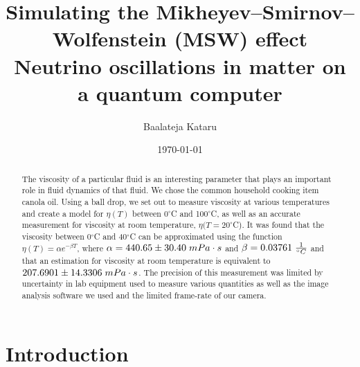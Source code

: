 \documentclass[aps,twocolumn,showpacs,preprintnumbers]{revtex4}
\begin{document}
\title{Simulating the Mikheyev–Smirnov–Wolfenstein (MSW) effect \\ Neutrino oscillations in matter on a quantum computer}

\author{Baalateja Kataru}


\date{\today}

\begin{abstract}

The viscosity of a particular fluid is an interesting parameter that plays an important role in fluid dynamics of that fluid. We chose the common household cooking item canola oil.
Using a ball drop, we set out to measure viscosity at various temperatures and create a model for $\eta (T)$ between 0$^{\circ}$C and 100$^{\circ}$C, as well as an accurate measurement for viscosity at room temperature, $\eta (T=20^{\circ}$C).
It was found that the viscosity between 0$^{\circ}$C and 40$^{\circ}$C can be approximated using the function $\eta (T) = \alpha e^{-\beta T}$, where $\alpha = 440.65 \pm 30.40 \hspace{0.1cm} mPa\cdot s$ and $\beta = 0.03761 \hspace{0.1cm} \frac{1}{^{\circ}C}$ and that an estimation for viscosity at room temperature is equivalent to $207.6901\pm14.3306 \hspace{0.1cm} mPa\cdot s$.
The precision of this measurement was limited by uncertainty in lab equipment used to measure various quantities as well as the image analysis software we used and the limited frame-rate of our camera.

\end{abstract}


\maketitle 

\section{Introduction}
\end{document}
